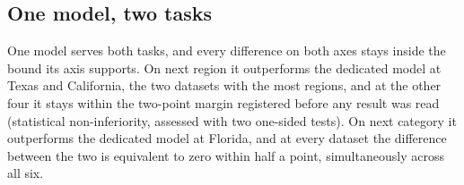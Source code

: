 

\subsection{One model, two tasks}
\label{sec:results-part2}
One model serves both tasks, and every difference on both axes stays inside the bound its axis
supports. On next region it
outperforms the dedicated model at Texas and California, the two datasets with the most regions, and
at the other four it stays within the two-point margin registered before any result was read
(statistical non-inferiority, assessed with two one-sided tests). On next category it outperforms the
dedicated model at Florida, and at every dataset the difference between the two is equivalent to zero
within half a point, simultaneously across all six.


